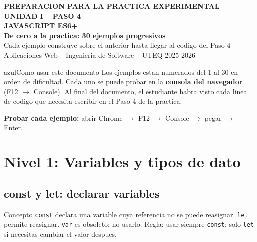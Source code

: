 \documentclass[11pt,a4paper]{article}
\begin{document}
	
	\begin{cajabanda}
		\begin{center}
			{\scriptsize\bfseries PREPARACION PARA LA PRACTICA EXPERIMENTAL UNIDAD I -- PASO 4}\\[5pt]
			{\LARGE\bfseries JAVASCRIPT ES6+}\\[3pt]
			{\large\bfseries De cero a la practica: 30 ejemplos progresivos}\\[3pt]
			{\normalsize Cada ejemplo construye sobre el anterior hasta llegar al codigo del Paso 4}\\[5pt]
			{\small Aplicaciones Web -- Ingenieria de Software -- UTEQ 2025-2026}
		\end{center}
	\end{cajabanda}
	
	\vspace{0.3cm}
	
	\begin{cajatip}{azul}{Como usar este documento}
		Los ejemplos estan numerados del 1 al 30 en orden de dificultad. Cada uno se puede probar en la \textbf{consola del navegador} (F12 $\to$ Console). Al final del documento, el estudiante habra visto cada linea de codigo que necesita escribir en el Paso 4 de la practica.
		
		\textbf{Probar cada ejemplo:} abrir Chrome $\to$ F12 $\to$ Console $\to$ pegar $\to$ Enter.
	\end{cajatip}
	
	\vspace{0.3cm}
	\tableofcontents
	\vspace{0.5cm}
	
	\section{Nivel 1: Variables y tipos de dato}
	
	\subsection{const y let: declarar variables}
	
	\begin{cajaconcepto}{Concepto}
		\texttt{const} declara una variable cuya referencia no se puede reasignar. \texttt{let} permite reasignar. \texttt{var} es obsoleto: no usarlo. Regla: usar siempre \texttt{const}; solo \texttt{let} si necesitas cambiar el valor despues.
	\end{cajaconcepto}
	
\end{document}
